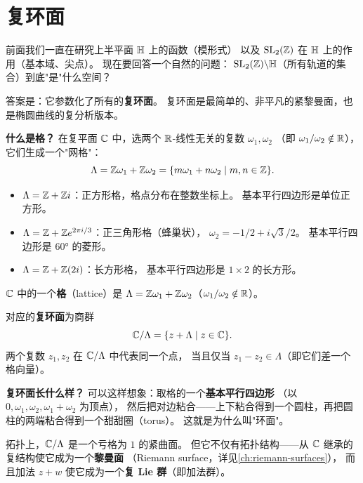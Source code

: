 \section{复环面}
\label{sec:complex-tori}

前面我们一直在研究上半平面 $\mathbb{H}$ 上的函数（模形式）
以及 $\mathrm{SL}_2(\mathbb{Z})$ 在 $\mathbb{H}$ 上的作用（基本域、尖点）。
现在要回答一个自然的问题：
$\mathrm{SL}_2(\mathbb{Z}) \backslash \mathbb{H}$（所有轨道的集合）到底"是"什么空间？

答案是：它参数化了所有的\textbf{复环面}。
复环面是最简单的、非平凡的紧黎曼面，也是椭圆曲线的复分析版本。

\textbf{什么是格？}
在复平面 $\mathbb{C}$ 中，选两个 $\mathbb{R}$-线性无关的复数 $\omega_1, \omega_2$
（即 $\omega_1/\omega_2 \notin \mathbb{R}$），它们生成一个"网格"：
\[
  \Lambda = \mathbb{Z}\omega_1 + \mathbb{Z}\omega_2
  = \{m\omega_1 + n\omega_2 \mid m, n \in \mathbb{Z}\}.
\]

\begin{example}[几个具体的格]
\label{ex:lattices}
\leavevmode
\begin{itemize}
  \item $\Lambda = \mathbb{Z} + \mathbb{Z} i$：正方形格，格点分布在整数坐标上。
    基本平行四边形是单位正方形。
  \item $\Lambda = \mathbb{Z} + \mathbb{Z} e^{2\pi i/3}$：正三角形格（蜂巢状），
    $\omega_2 = -1/2 + i\sqrt{3}/2$。
    基本平行四边形是 $60°$ 的菱形。
  \item $\Lambda = \mathbb{Z} + \mathbb{Z}(2i)$：长方形格，
    基本平行四边形是 $1 \times 2$ 的长方形。
\end{itemize}
\end{example}

\begin{definition}[格与复环面]
\label{def:lattice-torus}
$\mathbb{C}$ 中的一个\textbf{格}（lattice）是
$\Lambda = \mathbb{Z}\omega_1 + \mathbb{Z}\omega_2$（$\omega_1/\omega_2 \notin \mathbb{R}$）。

对应的\textbf{复环面}为商群
\[
  \mathbb{C}/\Lambda = \{z + \Lambda \mid z \in \mathbb{C}\}.
\]
两个复数 $z_1, z_2$ 在 $\mathbb{C}/\Lambda$ 中代表同一个点，
当且仅当 $z_1 - z_2 \in \Lambda$（即它们差一个格向量）。
\end{definition}

\textbf{复环面长什么样？}
可以这样想象：取格的一个\textbf{基本平行四边形}
（以 $0, \omega_1, \omega_2, \omega_1+\omega_2$ 为顶点），
然后把对边粘合——上下粘合得到一个圆柱，再把圆柱的两端粘合得到一个甜甜圈（torus）。
这就是为什么叫"环面"。

拓扑上，$\mathbb{C}/\Lambda$ 是一个亏格为 $1$ 的紧曲面。
但它不仅有拓扑结构——从 $\mathbb{C}$ 继承的复结构使它成为一个\textbf{黎曼面}
（Riemann surface，详见\cref{ch:riemann-surfaces}），
而且加法 $z + w$ 使它成为一个\textbf{复 Lie 群}（即加法群）。

